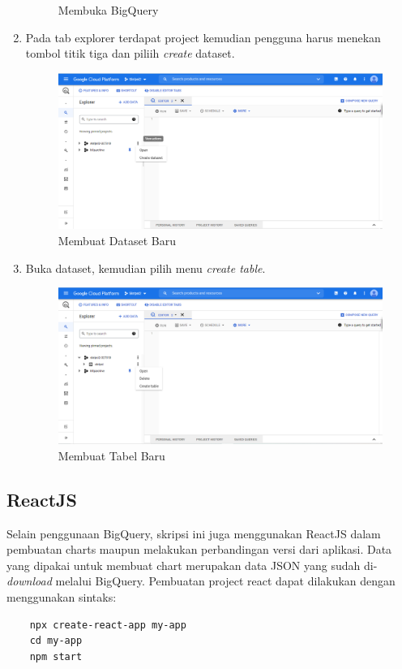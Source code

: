 \begin{enumerate}
\begin{figure}[H]
		\caption{Membuka BigQuery} 
		\label{fig:BQ} 
	\end{figure}
	\item Pada tab explorer terdapat project kemudian pengguna harus menekan tombol titik tiga dan piliih \textit{create} dataset.
	\begin{figure}[H]
		\centering  
		\includegraphics[scale=0.5]{Gambar/create_dataset.PNG}  
		\caption{Membuat Dataset Baru} 
		\label{fig:creat_dataset} 
	\end{figure}
	\item Buka dataset, kemudian pilih menu \textit{create table}.
	\begin{figure}[H]
		\centering  
		\includegraphics[scale=0.5]{Gambar/create_table.PNG}  
		\caption{Membuat Tabel Baru} 
		\label{fig:create_table} 
	\end{figure}
\end{enumerate}

\subsection{ReactJS}
Selain penggunaan BigQuery, skripsi ini juga menggunakan ReactJS dalam pembuatan charts maupun melakukan perbandingan versi dari aplikasi. Data yang dipakai untuk membuat chart merupakan data JSON yang sudah di-\textit{download} melalui BigQuery. Pembuatan project react dapat dilakukan dengan menggunakan sintaks:
\begin{verbatim}
	npx create-react-app my-app
	cd my-app
	npm start
\end{verbatim}

